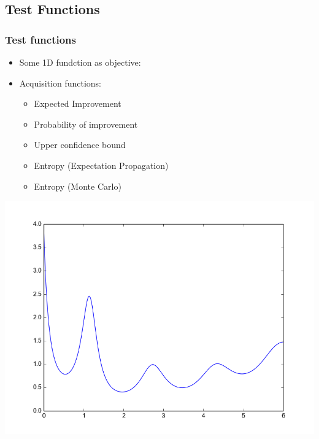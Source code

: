\documentclass[10pt,handout]{beamer}
\begin{document}



\subsection{Test Functions}



\begin{frame}
\frametitle{Test functions}
\begin{minipage}{0.55\textwidth}
\begin{itemize}
\item Some 1D fundction as objective:
\item Acquisition functions:
\begin{itemize}
\item Expected Improvement
\item Probability of improvement
\item Upper confidence bound
\item Entropy (Expectation Propagation)
\item Entropy (Monte Carlo)
\end{itemize}
\end{itemize}  
\end{minipage}%
\begin{minipage}{0.43\textwidth}
\includegraphics[width=\textwidth]{self_constructed_oned.png}
\end{minipage}
\end{frame}
\end{document}
